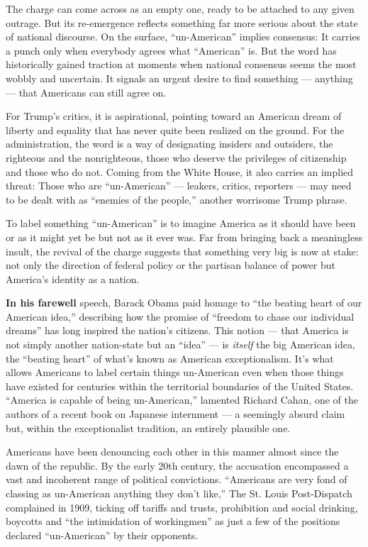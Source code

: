 The charge can come across as an empty one, ready to be attached to any
given outrage. But its re-emergence reflects something far more serious
about the state of national discourse. On the surface, ``un-American''
implies consensus: It carries a punch only when everybody agrees what
``American'' is. But the word has historically gained traction at
moments when national consensus seems the most wobbly and uncertain. It
signals an urgent desire to find something --- anything --- that
Americans can still agree on.

For Trump's critics, it is aspirational, pointing toward an American
dream of liberty and equality that has never quite been realized on the
ground. For the administration, the word is a way of designating
insiders and outsiders, the righteous and the nonrighteous, those who
deserve the privileges of citizenship and those who do not. Coming from
the White House, it also carries an implied threat: Those who are
``un-American'' --- leakers, critics, reporters --- may need to be dealt
with as ``enemies of the people,'' another worrisome Trump phrase.

To label something ``un-American'' is to imagine America as it should
have been or as it might yet be but not as it ever was. Far from
bringing back a meaningless insult, the revival of the charge suggests
that something very big is now at stake: not only the direction of
federal policy or the partisan balance of power but America's identity
as a nation.

\textbf{In his farewell} speech, Barack Obama paid homage to ``the
beating heart of our American idea,'' describing how the promise of
``freedom to chase our individual dreams'' has long inspired the
nation's citizens. This notion --- that America is not simply another
nation-state but an ``idea'' --- is \emph{itself} the big American idea,
the ``beating heart'' of what's known as American exceptionalism. It's
what allows Americans to label certain things un-American even when
those things have existed for centuries within the territorial
boundaries of the United States. ``America is capable of being
un-American,'' lamented Richard Cahan, one of the authors of a recent
book on Japanese internment --- a seemingly absurd claim but, within the
exceptionalist tradition, an entirely plausible one.

Americans have been denouncing each other in this manner almost since
the dawn of the republic. By the early 20th century, the accusation
encompassed a vast and incoherent range of political convictions.
``Americans are very fond of classing as un-American anything they don't
like,'' The St. Louis Post-Dispatch complained in 1909, ticking off
tariffs and trusts, prohibition and social drinking, boycotts and ``the
intimidation of workingmen'' as just a few of the positions declared
``un-American'' by their opponents.

